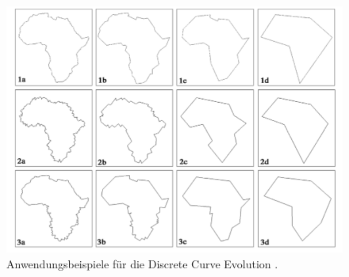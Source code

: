 {    \begin{figure}[ht]
        \centering
        \includegraphics*[scale = 0.65, keepaspectratio, trim=2 2 2 2 ]{images/DCE/schem_maps_paper_DCE.png}
        \caption[Anwendungsbeispiele für die \glqq Discrete Curve Evolution\grqq{}]{Anwendungsbeispiele für die \glqq Discrete Curve Evolution\grqq{}  \citep{Barkowsky2000}.}
        \label{Bsp_DCE_Bark_Paper}
    \end{figure}
    \clearpage
}
